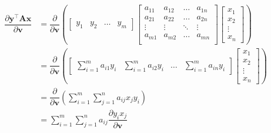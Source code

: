 \documentclass{article}
\newcommand{\trans}{\top}
\begin{document}
\begin{align}
    \dfrac{\partial \mathbf{y}^\trans \mathbf{A} \mathbf{x}}{\partial \mathbf{v}} &= \dfrac{\partial}{\partial \mathbf{v}} \left(
    \begin{bmatrix}
        y_{1} & y_{2} & \dots & y_{m}
    \end{bmatrix}
    \begin{bmatrix}
        a_{11} & a_{12} & \dots & a_{1n} \\
        a_{21} & a_{22} & \dots & a_{2n} \\
        \vdots & \vdots & \ddots & \vdots \\
        a_{m1} & a_{m2} & \dots & a_{mn} \\
    \end{bmatrix} \begin{bmatrix}
        x_{1} \\ x_{2} \\ \vdots \\ x_{n}
    \end{bmatrix} \right) \\
    &= \dfrac{\partial}{\partial \mathbf{v}} \left(
			\begin{bmatrix}
				\displaystyle \sum_{i = 1}^{m} a_{i1}y_{i} & 
				\displaystyle \sum_{i = 1}^{m} a_{i2}y_{i} & 
				\dots & 
				\displaystyle \sum_{i = 1}^{m} a_{in}y_{i}
			\end{bmatrix} \begin{bmatrix}
				x_{1} \\ x_{2} \\ \vdots \\ x_{n}
			\end{bmatrix} \right) \\
    &= \dfrac{\partial}{\partial \mathbf{v}} \left(
        \sum_{i = 1}^{m}\sum_{j = 1}^{n} a_{ij} x_{j} y_{i}
    \right) \\
    &= \sum_{i = 1}^{m}\sum_{j = 1}^{n} a_{ij} \dfrac{\partial y_{i}x_{j}}{\partial \mathbf{v}} %
\end{align}
\end{document}
